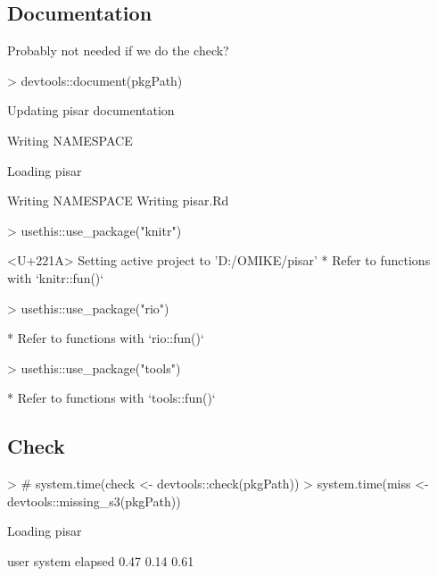 \documentclass[a4paper,12pt]{article}\usepackage[]{graphicx}\usepackage[]{color}
\begin{document}
\clearpage
\subsection{Documentation}
Probably not needed if we do the check?
\begin{Schunk}
\begin{Sinput}
> devtools::document(pkgPath)
\end{Sinput}
\begin{Soutput}
Updating pisar documentation
\end{Soutput}
\begin{Soutput}
Writing NAMESPACE
\end{Soutput}
\begin{Soutput}
Loading pisar
\end{Soutput}
\begin{Soutput}
Writing NAMESPACE
Writing pisar.Rd
\end{Soutput}
\begin{Sinput}
> usethis::use_package("knitr")
\end{Sinput}
\begin{Soutput}
<U+221A> Setting active project to 'D:/OMIKE/pisar'
* Refer to functions with `knitr::fun()`
\end{Soutput}
\begin{Sinput}
> usethis::use_package("rio")
\end{Sinput}
\begin{Soutput}
* Refer to functions with `rio::fun()`
\end{Soutput}
\begin{Sinput}
> usethis::use_package("tools")
\end{Sinput}
\begin{Soutput}
* Refer to functions with `tools::fun()`
\end{Soutput}
\end{Schunk}
\clearpage
\subsection{Check}
\begin{Schunk}
\begin{Sinput}
> # system.time(check <- devtools::check(pkgPath))
> system.time(miss <- devtools::missing_s3(pkgPath))
\end{Sinput}
\begin{Soutput}
Loading pisar
\end{Soutput}
\begin{Soutput}
   user  system elapsed 
   0.47    0.14    0.61 
\end{Soutput}
\end{Schunk}
\clearpage
\end{document}
